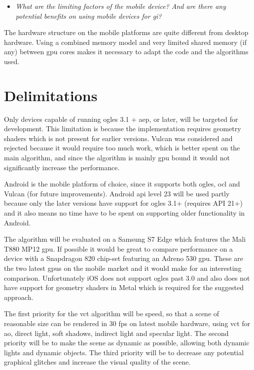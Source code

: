 \begin{itemize}
  \item \textit{What are the limiting factors of the mobile device? And are there any potential benefits on using mobile devices for \gls{gi}?}
\end{itemize}

The hardware structure on the mobile platforms are quite different from desktop hardware. 
Using a combined memory model and very limited shared memory (if any) between \gls{gpu} cores makes it necessary to adapt the code and the algorithms used.

\section{Delimitations}

Only devices capable of running \gls{ogles} 3.1 + \gls{aep}, or later, will be targeted for development. This limitation is because the implementation requires geometry shaders which is not present for earlier versions. 
Vulcan was considered and rejected because it would require too much work, which is better spent on the main algorithm, and since the algorithm is mainly \gls{gpu} bound it would not significantly increase the performance.

Android is the mobile platform of choice, since it supports both \gls{ogles}, \gls{ocl} and Vulcan (for future improvements). 
Android \acrshort{api} level 23 will be used partly because only the later versions have support for \gls{ogles} 3.1+ (requires API 21+) and it also means no time have to be spent on supporting older functionality in Android.

The algorithm will be evaluated on a Samsung S7 Edge which features the Mali T880 MP12 \gls{gpu}. 
If possible it would be great to compare performance on a device with a Snapdragon 820 chip-set featuring an Adreno 530 \gls{gpu}. These are the two latest \glspl{gpu} on the mobile market and it would make for an interesting comparison. 
Unfortunately iOS does not support \gls{ogles} past 3.0 and also does not have support for geometry shaders in Metal which is required for the suggested approach.

The first priority for the \gls{vct} algorithm will be speed, so that a scene of reasonable size can be rendered in 30 fps on latest mobile hardware, using \gls{vct} for \gls{ao}, direct light, soft shadows, indirect light and specular light. 
The second priority will be to make the scene as dynamic as possible, allowing both dynamic lights and dynamic objects. 
The third priority will be to decrease any potential graphical glitches and increase the visual quality of the scene. 